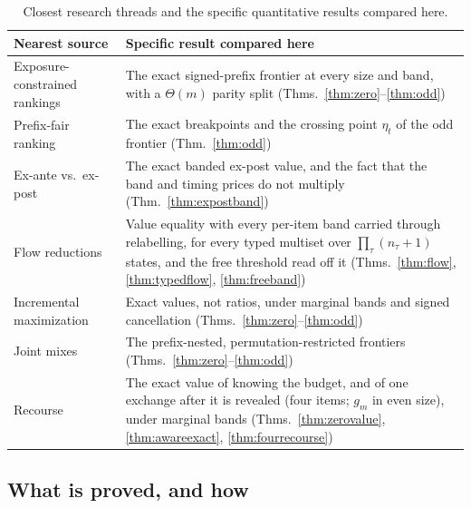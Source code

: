 \begin{table}[h]
\caption{Closest research threads and the specific quantitative results compared here.}
\label{tab:prior}
\centering
\footnotesize
\begin{tabular}{@{}p{}p{}@{}}
\toprule
Nearest source & Specific result compared here \\
\midrule
Exposure-constrained rankings~\cite{singh2018} & The exact signed-prefix frontier at every
size and band, with a $\Theta(m)$ parity split (Thms.~\ref{thm:zero}--\ref{thm:odd}) \\
Prefix-fair ranking~\cite{celis2018} & The exact breakpoints and the crossing point
$\eta_{t}$ of the odd frontier (Thm.~\ref{thm:odd}) \\
Ex-ante vs.\ ex-post~\cite{singh2021,freeman2020} & The exact banded ex-post value, and the
fact that the band and timing prices do not multiply (Thm.~\ref{thm:expostband}) \\
Flow reductions~\cite{schrijver2003} & Value equality with every per-item band carried
through relabelling, for every typed multiset over $\prod_\tau(n_\tau+1)$ states, and the free
threshold read off it (Thms.~\ref{thm:flow}, \ref{thm:typedflow}, \ref{thm:freeband}) \\
Incremental maximization~\cite{disser2023,bienkowski2026} & Exact values, not ratios, under
marginal bands and signed cancellation (Thms.~\ref{thm:zero}--\ref{thm:odd}) \\
Joint mixes~\cite{koike2022} & The prefix-nested, permutation-restricted frontiers
(Thms.~\ref{thm:zero}--\ref{thm:odd}) \\
Recourse~\cite{gupta2022} & The exact value of knowing the budget, and of one exchange after it
is revealed (four items; $g_m$ in even size), under marginal bands (Thms.~\ref{thm:zerovalue},
\ref{thm:awareexact}, \ref{thm:fourrecourse}) \\
\bottomrule
\end{tabular}
\end{table}

\subsection{What is proved, and how}

